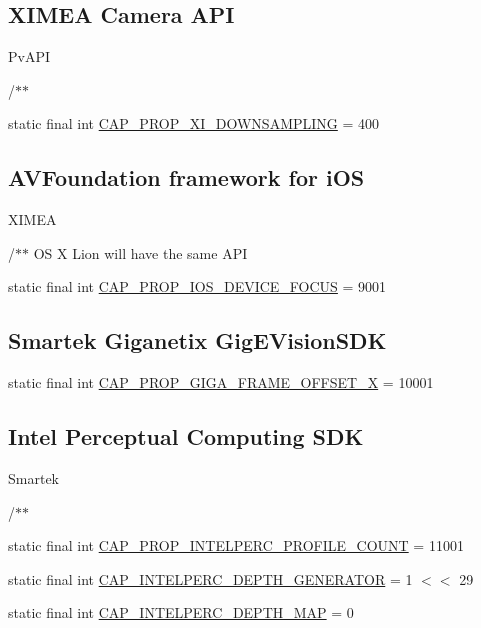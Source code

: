 \subsection*{X\+I\+M\+EA Camera A\+PI}
\label{_amgrp27700f107007c227ac22f266c008393b}%
 Pv\+A\+PI 

/$\ast$$\ast$ \begin{DoxyCompactItemize}
\item 
static final int \hyperlink{group__videoio__flags__others_ga8cffe0305b23ba68e84c3948d29ed9d7}{C\+A\+P\+\_\+\+P\+R\+O\+P\+\_\+\+X\+I\+\_\+\+D\+O\+W\+N\+S\+A\+M\+P\+L\+I\+NG} = 400
\end{DoxyCompactItemize}
\subsection*{A\+V\+Foundation framework for i\+OS}
\label{_amgrpa29adce7291c258c56920a735b90577a}%
 X\+I\+M\+EA 

/$\ast$$\ast$ OS X Lion will have the same A\+PI \begin{DoxyCompactItemize}
\item 
static final int \hyperlink{group__videoio__flags__others_gaf0a40895d86f9a304aefc2b1293ada0b}{C\+A\+P\+\_\+\+P\+R\+O\+P\+\_\+\+I\+O\+S\+\_\+\+D\+E\+V\+I\+C\+E\+\_\+\+F\+O\+C\+US} = 9001
\end{DoxyCompactItemize}
\subsection*{Smartek Giganetix Gig\+E\+Vision\+S\+DK}
\begin{DoxyCompactItemize}
\item 
static final int \hyperlink{group__videoio__flags__others_gab4ddba80d08c7d12c1cf05ad5f3182a0}{C\+A\+P\+\_\+\+P\+R\+O\+P\+\_\+\+G\+I\+G\+A\+\_\+\+F\+R\+A\+M\+E\+\_\+\+O\+F\+F\+S\+E\+T\+\_\+X} = 10001
\end{DoxyCompactItemize}
\subsection*{Intel Perceptual Computing S\+DK}
\label{_amgrpfb2ec7d2cacf22b3dd4fcd13264794c9}%
 Smartek 

/$\ast$$\ast$ \begin{DoxyCompactItemize}
\item 
static final int \hyperlink{group__videoio__flags__others_gaa9b3af0c8f28aea91749058639e286f7}{C\+A\+P\+\_\+\+P\+R\+O\+P\+\_\+\+I\+N\+T\+E\+L\+P\+E\+R\+C\+\_\+\+P\+R\+O\+F\+I\+L\+E\+\_\+\+C\+O\+U\+NT} = 11001
\item 
static final int \hyperlink{group__videoio__flags__others_gab66c209bfa351264f55727db980328f2}{C\+A\+P\+\_\+\+I\+N\+T\+E\+L\+P\+E\+R\+C\+\_\+\+D\+E\+P\+T\+H\+\_\+\+G\+E\+N\+E\+R\+A\+T\+OR} = 1 $<$$<$ 29
\item 
static final int \hyperlink{group__videoio__flags__others_ga81daac9eadb7d66e1f26c0d984b68c82}{C\+A\+P\+\_\+\+I\+N\+T\+E\+L\+P\+E\+R\+C\+\_\+\+D\+E\+P\+T\+H\+\_\+\+M\+AP} = 0
\end{DoxyCompactItemize}
